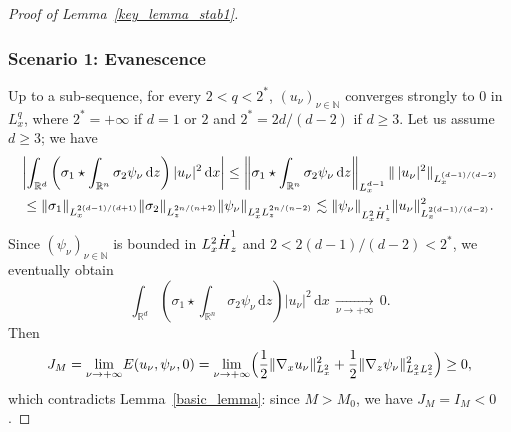 \documentclass[11pt]{article}
\DeclareRobustCommand{\accentset}[2]{\overset{#1}{#2}}
\theoremstyle{definition}
\newcommand*{\overbigdot}[1]{%
\accentset{\mbox{\large\bfseries .}}{#1}}
\newenvironment{ProofOf}[1]{\begin{proof}[Proof of #1]}{\end{proof}}
\newcommand{\R}{\mathbb{R}}
\newcommand{\ud}{\, {\mathrm{d}}}
\begin{document}
\begin{ProofOf}{Lemma~\ref{key_lemma_stab1}}
\subsubsection*{Scenario 1: Evanescence} Up to a sub-sequence, for every $2<q<2^{*}$, $(u_{\nu})_{\nu\in\mathbb N}$ converges strongly to $0$ in $L_{x}^{q}$,
where $2^{*}=+\infty$ if $d=1$ or $2$ and $2^{*}=2d/(d-2)$ if $d\geq 3$. Let us assume $d\geq 3$; we have\vspace*{-3pt}
\begin{multline*}
\left|\int_{\R^{d}}\left(\sigma_{1}\star\int_{\R^{n}}\sigma_{2}\psi_{\nu}\ud z\right)|u_{\nu}|^{2}\ud x\right|\leq\left\|\sigma_{1}\star\int_{\R^{n}}\sigma_{2}\psi_{\nu}\ud z\right\|_{L_{x}^{d-1}}\|\,|u_{\nu}|^{2}\|_{L_{x}^{(d-1)/(d-2)}}\\
\leq\|\sigma_{1}\|_{L_{x}^{2(d-1)/(d+1)}}\|\sigma_{2}\|_{L_{z}^{2n/(n+2)}}\|\psi_{\nu}\|_{L_{x}^{2}L_{z}^{2n/(n-2)}}\lesssim\|\psi_{\nu}\|_{L_{x}^{2}\overbigdot{H}_{z}^{1}}\|u_{\nu}\|_{L_{x}^{2(d-1)/(d-2)}}^{2}.
\end{multline*}
Since $(\psi_{\nu})_{\nu\in\mathbb N}$ is bounded in $L_{x}^{2}\overbigdot{H}_{z}^{1}$ and $2<2(d-1)/(d-2)<2^{*}$, we even\-tual\-ly obtain\vspace*{-3pt}
\[
\int_{\R^{d}}\left(\sigma_{1}\star\int_{\R^{n}}\sigma_{2}\psi_{\nu}\ud z\right)|u_{\nu}|^{2}\ud x\,\underset{\nu\to +\infty}{\to}\,0.
\]
Then
\[
J_{M}=\underset{\nu\to+\infty}{\lim}E(u_{\nu},\psi_{\nu},0)=\underset{\nu\to+\infty}{\lim}\Bigl(\frac{1}{2}\|\nabla_{x}u_\nu\|_{L_{x}^{2}}^{2}+\frac{1}{2}\|\nabla_{z}\psi_{\nu}\|_{L_{x}^{2}L_{z}^{2}}^{2}\Bigr)\geq 0,
\]
which contradicts Lemma~\ref{basic_lemma}: since $M>M_0$, we have $J_{M}=I_M<0$.


\end{ProofOf}
\end{document}
